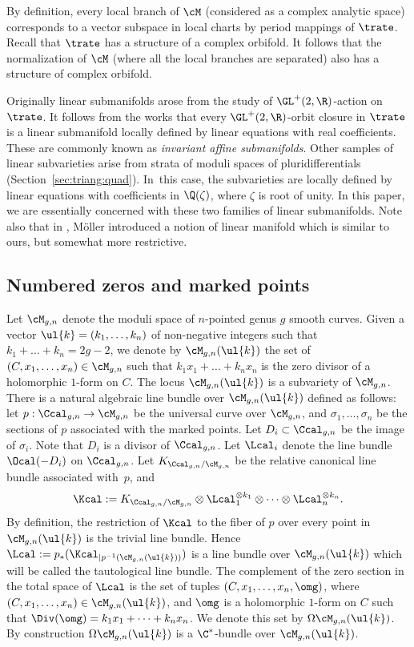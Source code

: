 \begin{Remark}\label{rk:lin:subman:orbifold}
By definition, every local branch of $\cM$ (considered as a complex analytic space) corresponds to a vector subspace in local charts by period mappings of $\trate$.
Recall that $\trate$ has a structure of a complex orbifold. It follows that the normalization of $\cM$ (where all the local branches are separated) also has a structure of complex orbifold.
\end{Remark}

Originally linear submanifolds arose from the study of $\GL^+(2,\R)$-action on $\trate$. It follows from the works \cite{EM18, EMM15, Filip16} that every $\GL^+(2,\R)$-orbit closure in $\trate$ is a linear submanifold locally defined by linear equations with real coefficients. These are commonly known as \emph{invariant affine submanifolds}. Other samples of linear subvarieties arise from strata of moduli spaces of pluri\-differentials (\cf Section~\ref{sec:triang:quad}). In~this case, the subvarieties are locally defined by linear equations with coefficients in $\Q(\zeta)$, where $\zeta$ is root of unity. In this paper, we are essentially concerned with these two families of linear submanifolds.
Note also that in \cite[Def.\,6.4]{Moller08}, Möller introduced a notion of linear manifold which is similar to ours, but somewhat more restrictive.

\subsection{Numbered zeros and marked points}\label{subsec:numb:zeros}
Let $\cM_{g,n}$ denote the moduli space of $n$-pointed genus $g$ smooth curves. Given a vector $\ul{k}=(k_1,\dots,k_n)$ of non-negative integers such that $k_1+\dots+k_n=2g-2$, we denote by $\cM_{g,n}(\ul{k})$ the set of $(C,x_1,\dots,x_n) \in \cM_{g,n}$ such that $k_1x_1+\dots+k_nx_n$ is the zero divisor of a holomorphic $1$-form on $C$. The locus $\cM_{g,n}(\ul{k})$ is a subvariety of $\cM_{g,n}$. There is a natural algebraic line bundle over $\cM_{g,n}(\ul{k})$ defined as follows: let $p:\Ccal_{g,n}\to \cM_{g,n}$ be the universal curve over $\cM_{g,n}$, and $\sigma_1,\dots,\sigma_n$ be the sections of $p$ associated with the marked points. Let $D_i\subset \Ccal_{g,n}$ be the image of $\sigma_i$. Note that $D_i$ is a divisor of $\Ccal_{g,n}$.
Let $\Lcal_i$ denote the line bundle $\Ocal(-D_i)$ on $\Ccal_{g,n}$. Let $K_{\Ccal_{g,n}/\cM_{g,n}}$ be the relative canonical line bundle associated with~$p$, and
\[
\Kcal:=K_{\Ccal_{g,n}/\cM_{g,n}}\otimes\Lcal_1^{\otimes k_1}\otimes\dots\otimes\Lcal_n^{\otimes k_n}.
\]
By definition, the restriction of $\Kcal$ to the fiber of $p$ over every point in $\cM_{g,n}(\ul{k})$ is the trivial line bundle. Hence $\Lcal:=p_*(\Kcal_{|p^{-1}(\cM_{g,n}(\ul{k}))})$ is a line bundle over $\cM_{g,n}(\ul{k})$ which will be called the tautological line bundle.
The complement of the zero section in the total space of $\Lcal$ is the set of tuples $(C,x_1,\dots,x_n,\omg)$, where $(C,x_1,\dots,x_n) \in\nobreak \cM_{g,n}(\ul{k})$, and $\omg$ is a holomorphic $1$-form on $C$ such that $\Div(\omg)=k_1x_1+\dots+k_nx_n$. We denote this set by $\Omega\cM_{g,n}(\ul{k})$. By construction $\Omega\cM_{g,n}(\ul{k})$ is a $\C^*$-bundle over $\cM_{g,n}(\ul{k})$.

